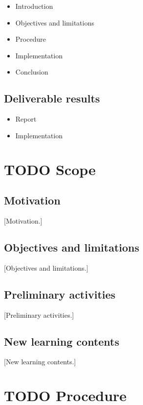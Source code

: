 \documentclass[10pt, openright, notitlepage]{scrreprt}
\begin{document}
\begin{itemize}
\item Introduction
\item Objectives and limitations
\item Procedure
\item Implementation
\item Conclusion
\end{itemize}

\section{Deliverable results}
\label{sec:orga22e953}

\begin{itemize}
\item Report
\item Implementation
\end{itemize}

\chapter{{\bfseries\sffamily TODO} Scope}
\label{sec:orgd72fc86}

\section{Motivation}
\label{sec:org4add7cb}

[Motivation.]

\section{Objectives and limitations}
\label{sec:org03b67b2}

[Objectives and limitations.]

\section{Preliminary activities}
\label{sec:org551d103}

[Preliminary activities.]

\section{New learning contents}
\label{sec:org3c010ea}

[New learning contents.]

\chapter{{\bfseries\sffamily TODO} Procedure}
\label{sec:org62d5965}
\end{document}
